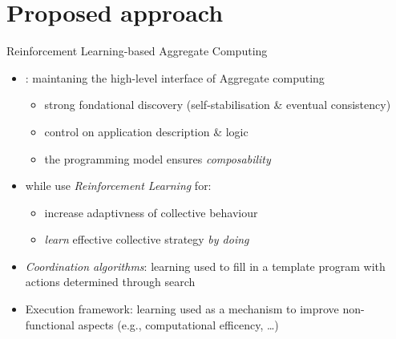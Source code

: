 \documentclass[9pt, aspectratio=169, handout]{beamer}
\begin{document}
\section{Proposed approach}
\begin{frame}{Reinforcement Learning-based Aggregate Computing}
\begin{cardTiny}
  \begin{itemize}
    \item {}: maintaning the high-level interface of Aggregate computing
    \begin{itemize}
      \item[\faArrowRight] strong fondational discovery (self-stabilisation \& eventual consistency)
      \item[\faArrowRight] control on application description \& logic
      \item[\faArrowRight] the programming model ensures \emph{composability}
    \end{itemize}
    \item  while use \emph{Reinforcement Learning} for:
    \begin{itemize}
      \item[\faArrowRight] increase adaptivness of collective behaviour
      \item[\faArrowRight] \emph{learn} effective collective strategy \emph{by doing}
    \end{itemize}
  \end{itemize}
\end{cardTiny}

\begin{card}
  \begin{itemize}
    \item \emph{Coordination algorithms}: learning used to fill  in a template program with actions determined through search
    \item Execution framework: learning used as a mechanism to improve non-functional aspects (e.g., computational efficency, \dots)
  \end{itemize}
\end{card}
\end{frame}
\end{document}
